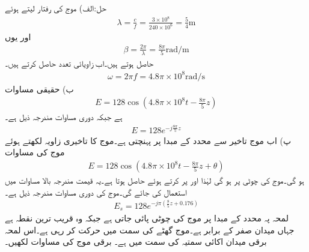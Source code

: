 حل:الف) موج کی رفتار  لیتے ہوئے 
\begin{align*}
\lambda=\frac{c}{f}=\frac{3\times 10^8}{240\times 10^6}=\frac{5}{4}\si{\meter}
\end{align*}
اور یوں
\begin{align*}
\beta=\frac{2\pi}{\lambda}=\frac{8\pi}{5}\si{\radian \per\meter}
\end{align*}
حاصل ہوتے ہیں۔اب زاویائی تعدد حاصل کرتے ہیں۔
\begin{align*}
\omega= 2\pi f =4.8\pi \times 10^{8} \si{\radian \per \second}
\end{align*}
ب) حقیقی مساوات 
\begin{align*}
E=128 \cos \left(4.8\pi \times 10^8 t -\frac{8\pi }{5} z \right)
\end{align*}
ہے جبکہ دوری مساوات مندرجہ ذیل ہے۔
\begin{align*}
E=128 e^{-j\frac{8\pi }{5} z}
\end{align*}
پ) اب موج تاخیر سے محدد کے مبدا پر پہنچتی ہے۔موج کا تاخیری زاویہ  لکھتے ہوئے موج کی مساوات
\begin{align*}
E=128 \cos \left(4.8\pi \times 10^8 t -\frac{8\pi }{5} z +\theta \right)
\end{align*}
ہو گی۔موج کی چوٹی  پر ہو گی لہٰذا  اور  پر کرتے ہوئے   حاصل ہوتا ہے۔یہ قیمت مندرجہ بالا مساوات میں استعمال کی جائے گی۔موج کی دوری مساوات مندرجہ ذیل ہے۔
\begin{align*}
E_s=128 e^{-j \pi (\frac{8}{5} z +0.176) }
\end{align*} 
لمحہ  پہ محدد کے مبدا پر موج کی چوٹی  پائی جاتی ہے جبکہ  وہ قریب ترین نقطہ ہے جہاں میدان صفر کے برابر ہے۔موج گھٹے  کی سمت میں حرکت کر رہی ہے۔اس لمحہ برقی میدان اکائی
 سمتیہ  کی سمت میں ہے۔ برقی موج کی مساوات لکھیں۔

